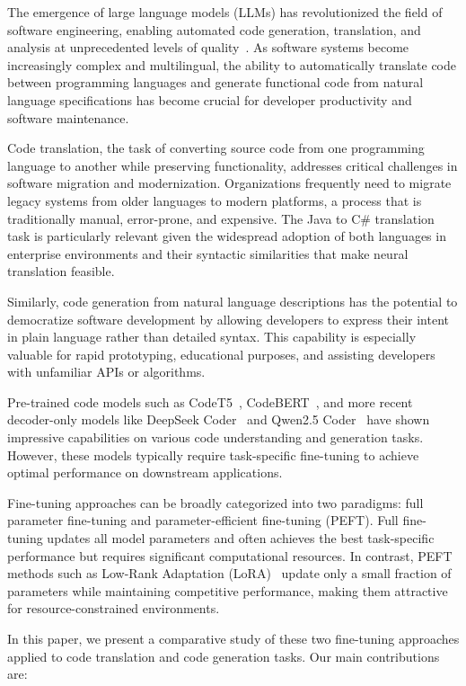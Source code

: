\documentclass[conference]{IEEEtran}
\begin{document}
The emergence of large language models (LLMs) has revolutionized the field of software engineering, enabling automated code generation, translation, and analysis at unprecedented levels of quality~\cite{chen2021codex}. As software systems become increasingly complex and multilingual, the ability to automatically translate code between programming languages and generate functional code from natural language specifications has become crucial for developer productivity and software maintenance.

Code translation, the task of converting source code from one programming language to another while preserving functionality, addresses critical challenges in software migration and modernization. Organizations frequently need to migrate legacy systems from older languages to modern platforms, a process that is traditionally manual, error-prone, and expensive. The Java to C\# translation task is particularly relevant given the widespread adoption of both languages in enterprise environments and their syntactic similarities that make neural translation feasible.

Similarly, code generation from natural language descriptions has the potential to democratize software development by allowing developers to express their intent in plain language rather than detailed syntax. This capability is especially valuable for rapid prototyping, educational purposes, and assisting developers with unfamiliar APIs or algorithms.

Pre-trained code models such as CodeT5~\cite{wang2021codet5}, CodeBERT~\cite{feng2020codebert}, and more recent decoder-only models like DeepSeek Coder~\cite{deepseek2024} and Qwen2.5 Coder~\cite{qwen2024} have shown impressive capabilities on various code understanding and generation tasks. However, these models typically require task-specific fine-tuning to achieve optimal performance on downstream applications.

Fine-tuning approaches can be broadly categorized into two paradigms: full parameter fine-tuning and parameter-efficient fine-tuning (PEFT). Full fine-tuning updates all model parameters and often achieves the best task-specific performance but requires significant computational resources. In contrast, PEFT methods such as Low-Rank Adaptation (LoRA)~\cite{hu2021lora} update only a small fraction of parameters while maintaining competitive performance, making them attractive for resource-constrained environments.

In this paper, we present a comparative study of these two fine-tuning approaches applied to code translation and code generation tasks. Our main contributions are:
\end{document}
